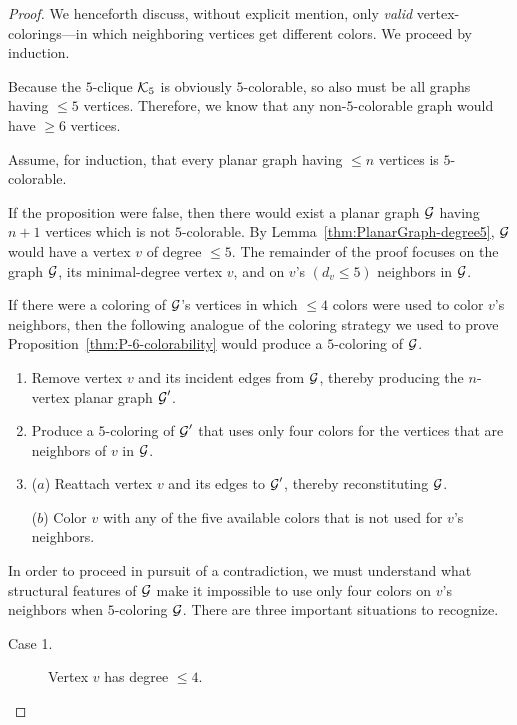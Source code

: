 \begin{proof}
We henceforth discuss, without explicit mention, only {\em valid} vertex-colorings---in which neighboring vertices get different colors.  We proceed by induction.

\medskip

Because the $5$-clique $\mbox{$\cal K$}_5$ is obviously $5$-colorable, so also must be all graphs having $\leq 5$ vertices.  Therefore, we know that any non-$5$-colorable graph would have $\geq 6$ vertices.

\medskip

Assume, for induction, that every planar graph having $\leq n$ vertices is $5$-colorable.

\medskip

If the proposition were false, then there would exist a planar graph $\mbox{$\cal G$}$ having $n+1$ vertices which is not $5$-colorable.  By Lemma~\ref{thm:PlanarGraph-degree5}, $\mbox{$\cal G$}$ would have a vertex $v$ of degree $\leq 5$.  The remainder of the proof focuses on the graph $\mbox{$\cal G$}$, its minimal-degree vertex $v$, and on $v$'s $(d_v \leq 5)$ neighbors in $\mbox{$\cal G$}$.

\smallskip

If there were a coloring of $\mbox{$\cal G$}$'s vertices in which $\leq 4$ colors were used to color $v$'s neighbors, then the following analogue of the coloring strategy we used to prove Proposition~\ref{thm:P-6-colorability} would produce a $5$-coloring of $\mbox{$\cal G$}$.
\begin{enumerate}
\item
Remove vertex $v$ and its incident edges from $\mbox{$\cal G$}$, thereby producing the $n$-vertex planar graph $\mbox{$\cal G$}'$.
\medskip\item
Produce a $5$-coloring of $\mbox{$\cal G$}'$ that uses only four colors for the vertices that are neighbors of $v$ in $\mbox{$\cal G$}$.
\medskip\item
($a$) Reattach vertex $v$ and its edges to $\mbox{$\cal G$}'$, thereby reconstituting $\mbox{$\cal G$}$.

\smallskip

($b$) Color $v$ with any of the five available colors that is not used for $v$'s neighbors.
\end{enumerate}

\smallskip

In order to proceed in pursuit of a contradiction, we must understand what structural features of $\mbox{$\cal G$}$ make it impossible to use only four colors on $v$'s neighbors when $5$-coloring $\mbox{$\cal G$}$.  There are three important situations to recognize.
\begin{description}
\item[{\sf Case 1}.]
Vertex $v$ has degree $\leq 4$.


\end{description}
\end{proof}
